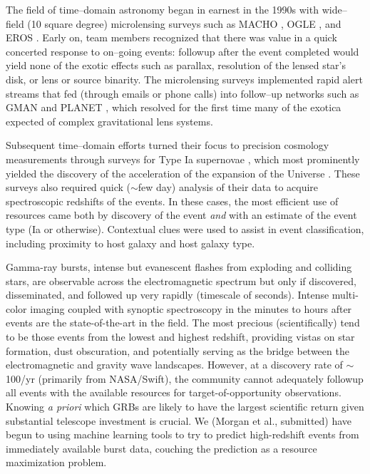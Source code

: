 \smallskip

The field of time--domain astronomy began in earnest in the 1990s with
wide--field (10 square degree) microlensing surveys such as MACHO
\citep{2000ApJ...542..281A}, OGLE \citep{1994AcA....44..227U}, and EROS
\citep{2003A&A...400..951A}.   Early on, team members recognized that there was
value in a quick concerted response to on--going events: followup after the
event completed would yield none of the exotic effects such as parallax,
resolution of the lensed star's disk, or lens or source binarity.  The
microlensing surveys implemented rapid alert streams that fed (through emails or
phone calls) into follow--up networks such as GMAN \citep{2000PhDT.......258B}
and PLANET \citep{1998ApJ...509..687A}, which resolved for the first time many
of the exotica expected of complex gravitational lens systems.

Subsequent time--domain efforts turned their focus to precision cosmology
measurements through surveys for Type Ia supernovae \citep{1996AJ....112.2398H},
which most prominently yielded the discovery of the acceleration of the
expansion of the Universe \citep{1998AJ....116.1009R,1999ApJ...517..565P}. These
surveys also required quick ($\sim$few day) analysis of their data to acquire
spectroscopic redshifts of the events. In these cases, the most efficient use of
resources came both by discovery of the event {\it and} with an estimate of the
event type (Ia or otherwise).  Contextual clues were used to assist in event
classification, including proximity to host galaxy and host galaxy type.

Gamma-ray bursts, intense but evanescent flashes from exploding and colliding
stars, are observable across the electromagnetic spectrum but only if
discovered, disseminated, and followed up very rapidly (timescale of seconds).
Intense multi-color imaging coupled with synoptic spectroscopy in the minutes to
hours after events are the state-of-the-art in the field. The most precious
(scientifically) tend to be those events from the lowest and highest redshift,
providing vistas on star formation, dust obscuration, and potentially serving as
the bridge between the electromagnetic and gravity wave landscapes. However, at
a discovery rate of $\sim$100/yr (primarily from NASA/Swift), the community
cannot adequately followup all events with the available resources for
target-of-opportunity observations. Knowing {\it a priori} which GRBs are likely
to have the largest scientific return given substantial telescope investment is
crucial. We (Morgan et al., submitted) have begun to using machine learning
tools to try to predict high-redshift events from immediately available burst
data, couching the prediction as a resource maximization problem.

